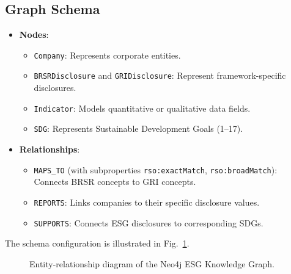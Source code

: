 \documentclass[journal,compsoc]{IEEEtran}
\begin{document}
\begin{itemize}
\subsection{Graph Schema}
\begin{itemize}
    \item \textbf{Nodes}:
        \begin{itemize}
            \item \texttt{Company}: Represents corporate entities.
            \item \texttt{BRSRDisclosure} and \texttt{GRIDisclosure}: Represent framework-specific disclosures.
            \item \texttt{Indicator}: Models quantitative or qualitative data fields.
            \item \texttt{SDG}: Represents Sustainable Development Goals (1--17).
        \end{itemize}
    \item \textbf{Relationships}:
        \begin{itemize}
            \item \texttt{MAPS\_TO} (with subproperties \texttt{rso:exactMatch}, \texttt{rso:broadMatch}): Connects BRSR concepts to GRI concepts.
            \item \texttt{REPORTS}: Links companies to their specific disclosure values.
            \item \texttt{SUPPORTS}: Connects ESG disclosures to corresponding SDGs.
        \end{itemize}
\end{itemize}

The schema configuration is illustrated in Fig.~\ref{fig:kg}.

\begin{figure}[h]
\centering
{}
\caption{Entity-relationship diagram of the Neo4j ESG Knowledge Graph.}
\label{fig:kg}
\end{figure}


\end{itemize}
\end{document}
